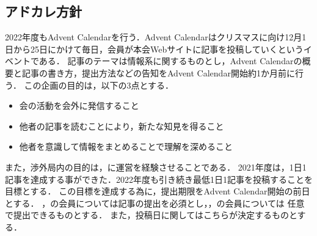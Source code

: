\subsection*{アドカレ方針}


2022年度もAdvent Calendarを行う．Advent Calendarはクリスマスに向け12月1日から25日にかけて毎日，会員が本会Webサイトに記事を投稿していくというイベントである．
記事のテーマは情報系に関するものとし，Advent Calendarの概要と記事の書き方，提出方法などの告知をAdvent Calendar開始約1か月前に行う．
この企画の目的は，以下の3点とする．
\begin{itemize}
    \item 会の活動を会外に発信すること
    \item 他者の記事を読むことにより，新たな知見を得ること
    \item 他者を意識して情報をまとめることで理解を深めること
\end{itemize}
また，渉外局内の目的は，\firstGrade{}に運営を経験させることである．
2021年度は，1日1記事を達成する事ができた．2022年度も引き続き最低1日1記事を投稿することを目標とする．
この目標を達成する為に，提出期限をAdvent Calendar開始の前日とする．
\firstGrade{}，\secondGrade{}の会員については記事の提出を必須とし，\thirdGrade{}，\fourthGrade{}の会員については
任意で提出できるものとする．
また，投稿日に関してはこちらが決定するものとする．
